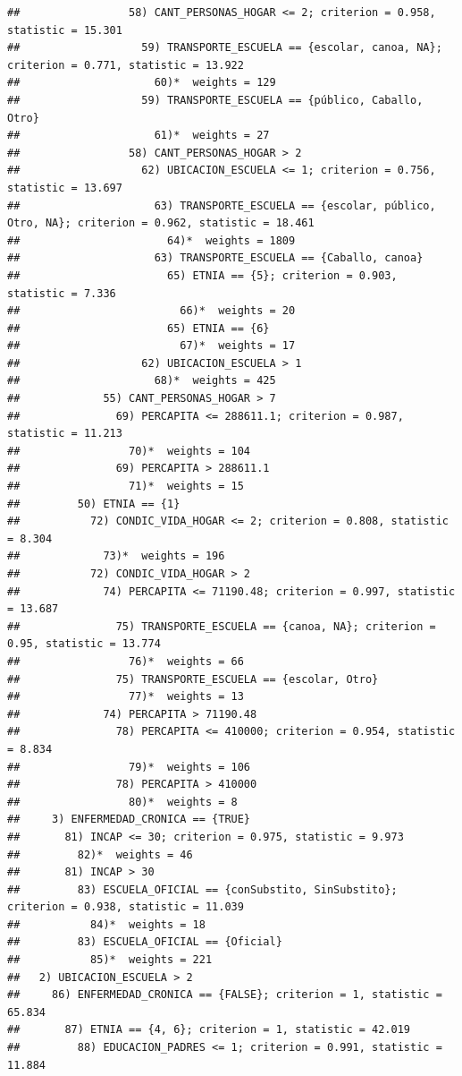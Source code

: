 \documentclass[
]{article}
\begin{document}
\begin{verbatim}
##                 58) CANT_PERSONAS_HOGAR <= 2; criterion = 0.958, statistic = 15.301
##                   59) TRANSPORTE_ESCUELA == {escolar, canoa, NA}; criterion = 0.771, statistic = 13.922
##                     60)*  weights = 129 
##                   59) TRANSPORTE_ESCUELA == {público, Caballo, Otro}
##                     61)*  weights = 27 
##                 58) CANT_PERSONAS_HOGAR > 2
##                   62) UBICACION_ESCUELA <= 1; criterion = 0.756, statistic = 13.697
##                     63) TRANSPORTE_ESCUELA == {escolar, público, Otro, NA}; criterion = 0.962, statistic = 18.461
##                       64)*  weights = 1809 
##                     63) TRANSPORTE_ESCUELA == {Caballo, canoa}
##                       65) ETNIA == {5}; criterion = 0.903, statistic = 7.336
##                         66)*  weights = 20 
##                       65) ETNIA == {6}
##                         67)*  weights = 17 
##                   62) UBICACION_ESCUELA > 1
##                     68)*  weights = 425 
##             55) CANT_PERSONAS_HOGAR > 7
##               69) PERCAPITA <= 288611.1; criterion = 0.987, statistic = 11.213
##                 70)*  weights = 104 
##               69) PERCAPITA > 288611.1
##                 71)*  weights = 15 
##         50) ETNIA == {1}
##           72) CONDIC_VIDA_HOGAR <= 2; criterion = 0.808, statistic = 8.304
##             73)*  weights = 196 
##           72) CONDIC_VIDA_HOGAR > 2
##             74) PERCAPITA <= 71190.48; criterion = 0.997, statistic = 13.687
##               75) TRANSPORTE_ESCUELA == {canoa, NA}; criterion = 0.95, statistic = 13.774
##                 76)*  weights = 66 
##               75) TRANSPORTE_ESCUELA == {escolar, Otro}
##                 77)*  weights = 13 
##             74) PERCAPITA > 71190.48
##               78) PERCAPITA <= 410000; criterion = 0.954, statistic = 8.834
##                 79)*  weights = 106 
##               78) PERCAPITA > 410000
##                 80)*  weights = 8 
##     3) ENFERMEDAD_CRONICA == {TRUE}
##       81) INCAP <= 30; criterion = 0.975, statistic = 9.973
##         82)*  weights = 46 
##       81) INCAP > 30
##         83) ESCUELA_OFICIAL == {conSubstito, SinSubstito}; criterion = 0.938, statistic = 11.039
##           84)*  weights = 18 
##         83) ESCUELA_OFICIAL == {Oficial}
##           85)*  weights = 221 
##   2) UBICACION_ESCUELA > 2
##     86) ENFERMEDAD_CRONICA == {FALSE}; criterion = 1, statistic = 65.834
##       87) ETNIA == {4, 6}; criterion = 1, statistic = 42.019
##         88) EDUCACION_PADRES <= 1; criterion = 0.991, statistic = 11.884

\end{verbatim}
\end{document}
